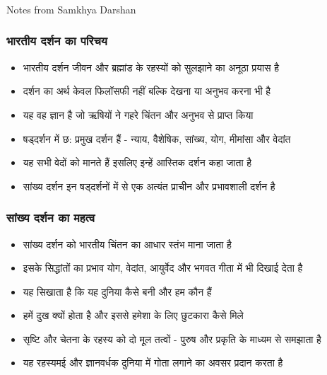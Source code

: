 \begin{frame}[fragile]\frametitle{}
\begin{center}
{\Large Notes from Samkhya Darshan}
\end{center}
\end{frame}

\begin{frame}[fragile]\frametitle{भारतीय दर्शन का परिचय}
      \begin{itemize}
	\item भारतीय दर्शन जीवन और ब्रह्मांड के रहस्यों को सुलझाने का अनूठा प्रयास है
	\item दर्शन का अर्थ केवल फिलॉसफी नहीं बल्कि देखना या अनुभव करना भी है
	\item यह वह ज्ञान है जो ऋषियों ने गहरे चिंतन और अनुभव से प्राप्त किया
	\item षड्दर्शन में छ: प्रमुख दर्शन हैं - न्याय, वैशेषिक, सांख्य, योग, मीमांसा और वेदांत
	\item यह सभी वेदों को मानते हैं इसलिए इन्हें आस्तिक दर्शन कहा जाता है
	\item सांख्य दर्शन इन षड्दर्शनों में से एक अत्यंत प्राचीन और प्रभावशाली दर्शन है
	  \end{itemize}
\end{frame}


\begin{frame}[fragile]\frametitle{सांख्य दर्शन का महत्व}
      \begin{itemize}
	\item सांख्य दर्शन को भारतीय चिंतन का आधार स्तंभ माना जाता है
	\item इसके सिद्धांतों का प्रभाव योग, वेदांत, आयुर्वेद और भगवत गीता में भी दिखाई देता है
	\item यह सिखाता है कि यह दुनिया कैसे बनी और हम कौन हैं
	\item हमें दुख क्यों होता है और इससे हमेशा के लिए छुटकारा कैसे मिले
	\item सृष्टि और चेतना के रहस्य को दो मूल तत्वों - पुरुष और प्रकृति के माध्यम से समझाता है
	\item यह रहस्यमई और ज्ञानवर्धक दुनिया में गोता लगाने का अवसर प्रदान करता है
	  \end{itemize}
\end{frame}

